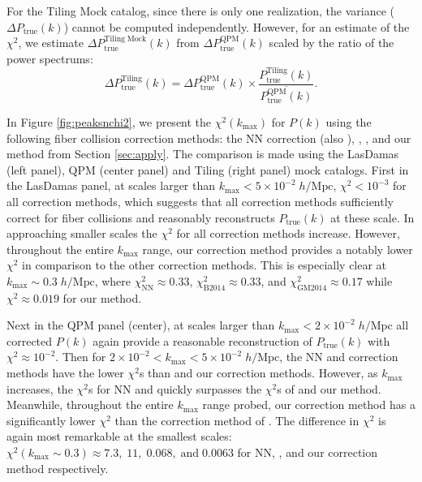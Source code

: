 \documentclass{emulateapj}
\begin{document}
For the Tiling Mock catalog, since there is only one realization, the variance ($\Delta P_\mathrm{true} (k)$) cannot be computed independently. However, for an estimate of the $\chi^2$, we estimate $\Delta P_\mathrm{true}^\mathrm{Tiling\;Mock}(k)$ from $\Delta P^\mathrm{QPM}_\mathrm{true} (k)$ scaled by the ratio of the power spectrums:
\begin{equation}
\Delta P_\mathrm{true}^\mathrm{Tiling}(k) = \Delta P_\mathrm{true}^\mathrm{QPM}(k) \times \frac{P_\mathrm{true}^\mathrm{Tiling}(k)}{\overline{P^\mathrm{QPM}_\mathrm{true}(k)}}.
\end{equation}

In Figure \ref{fig:peaksnchi2}, we present the $\chi^2(k_\mathrm{max})$ for $P(k)$ using the following fiber collision correction methods: the NN correction (also \citealt{Anderson:2012aa}), \cite{Beutler:2014aa}, \cite{Gil-Marin:2014aa}, and our method from Section \ref{sec:apply}. The comparison is made using the LasDamas (left panel), QPM (center panel) and Tiling (right panel) mock catalogs. First in the LasDamas panel, at scales larger than $k_\mathrm{max} < 5 \times 10^{-2} \; h/\mathrm{Mpc}$, $\chi^2 < 10^{-3}$ for all correction methods, which suggests that all correction methods sufficiently correct for fiber collisions and reasonably reconstructs $P_\mathrm{true}(k)$ at these scale. In approaching smaller scales the $\chi^2$ for all correction methods increase. However, throughout the entire $k_\mathrm{max}$ range, our correction method provides a notably lower $\chi^2$ in comparison to the other correction methods. This is especially clear at $k_\mathrm{max} \sim 0.3 \; h/\mathrm{Mpc}$, where $\chi^2_\mathrm{NN} \approx 0.33$, $\chi^2_\mathrm{B2014} \approx 0.33$, and $\chi^2_\mathrm{GM2014} \approx 0.17$ while $\chi^2 \approx 0.019$ for our method. 

Next in the QPM panel (center), at scales larger than $k_\mathrm{max} < 2 \times 10^{-2} \; h/\mathrm{Mpc}$ all corrected $P(k)$ again provide a reasonable reconstruction of $P_\mathrm{true}(k)$ with $\chi^2 \approx 10^{-2}$. Then for $2 \times 10^{-2} < k_\mathrm{max} < 5 \times 10^{-2}\; h/\mathrm{Mpc}$, the NN and \cite{Beutler:2014aa} correction methods have the lower $\chi^2$s than \cite{Gil-Marin:2014aa} and our correction methods. However, as $k_\mathrm{max}$ increases, the $\chi^2$s for NN and \cite{Beutler:2014aa} quickly surpasses the $\chi^2$s of \cite{Gil-Marin:2014aa} and our method. Meanwhile, throughout the entire $k_\mathrm{max}$ range probed, our correction method has a significantly lower $\chi^2$ than the correction method of \cite{Gil-Marin:2014aa}. The difference in $\chi^2$ is again most remarkable at the smallest scales: $\chi^2 (k_\mathrm{max} \sim 0.3) \approx 7.3,\;11, \;0.068, \;\mathrm{and} \; 0.0063$ for NN, \cite{Beutler:2014aa}, \cite{Gil-Marin:2014aa} and our correction method respectively. 
\end{document}
